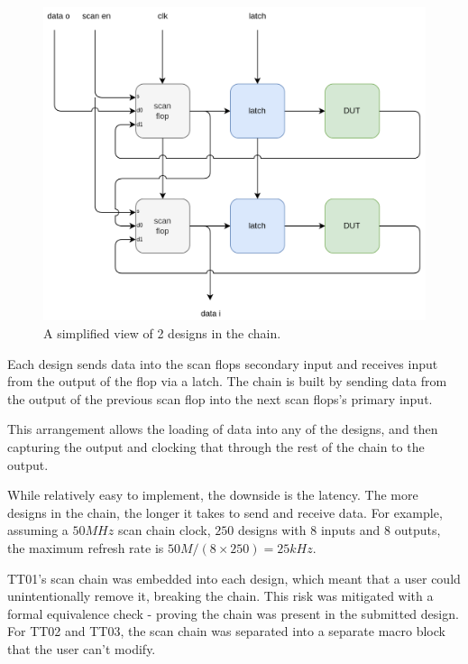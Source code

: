 \begin{figure}[htp]
\centering
\includegraphics[width=\columnwidth]{./Figs/scanchain_block_diagram.png}
\caption{A simplified view of 2 designs in the chain.}
\label{fig:simplified_view_2_designs}
\end{figure}

Each design sends data into the scan flops secondary input and receives input from the output of the flop via a latch.
The chain is built\cite{updateiodesign} by sending data from the output of the previous scan flop into the next scan flops’s primary input.

This arrangement allows the loading of data into any of the designs, and then capturing the output and clocking that through the rest of the chain to the output.

While relatively easy to implement, the downside is the latency.
The more designs in the chain, the longer it takes to send and receive data.
For example, assuming a \(50 MHz\) scan chain clock, \(250\) designs with \(8\) inputs and \(8\) outputs, the maximum refresh rate is \(50M / (8 \times 250) = 25kHz\).

TT01’s scan chain was embedded into each design, which meant that a user could unintentionally remove it, breaking the chain.
This risk was mitigated with a formal\cite{tinytapeoutscan} equivalence check - proving the chain was present in the submitted design.
For TT02 and TT03, the scan chain was separated into a separate macro block that the user can’t modify.

